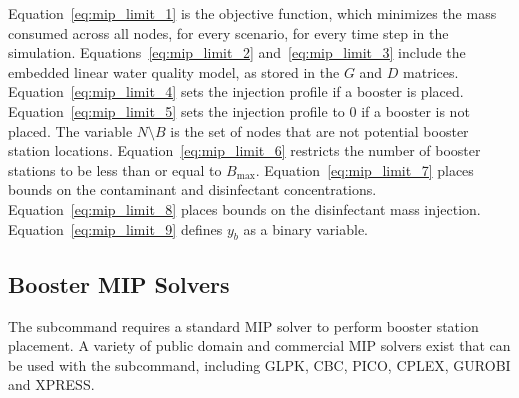 Equation~\ref{eq:mip_limit_1} is the objective function, which minimizes the mass consumed 
across all nodes, for every scenario, for every time step in the simulation. Equations~\ref{eq:mip_limit_2} 
and~\ref{eq:mip_limit_3} include the embedded linear water quality model, as stored in 
the $G$ and $D$ matrices. Equation~\ref{eq:mip_limit_4} sets the injection profile if a booster is placed. 
Equation~\ref{eq:mip_limit_5} sets the injection profile to 0 if a booster is not placed. 
The variable $N \setminus B$ is the set of nodes that are not potential booster station locations.
Equation~\ref{eq:mip_limit_6} restricts the number of booster stations to be less than or 
equal to $B_{\max}$. Equation~\ref{eq:mip_limit_7} places bounds on the
contaminant and disinfectant concentrations.  
Equation~\ref{eq:mip_limit_8} places bounds on the disinfectant mass injection.
Equation~\ref{eq:mip_limit_9} defines $y_{b}$ as a binary variable.


\subsection{Booster MIP Solvers}\label{booster_mip_solver}
\label{sec.booster_mip_solver}
The  subcommand requires a standard MIP solver to perform 
booster station placement. A variety of public domain and commercial MIP solvers exist 
that can be used with the  subcommand, including GLPK, CBC, 
PICO, CPLEX, GUROBI and XPRESS. 

